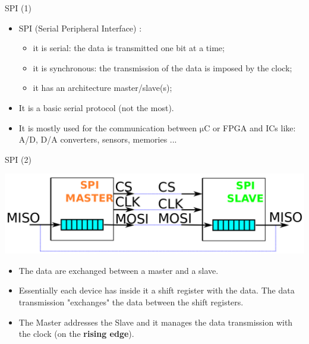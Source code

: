 \documentclass[ignorenonframetext,aspectratio=43,]{beamer}
\begin{document}
\begin{frame}{SPI (1)}
\protect\hypertarget{spi-1}{}

\begin{itemize}
\item
  SPI (Serial Peripheral Interface) :

  \begin{itemize}
  \item
    it is serial: the data is transmitted one bit at a time;
  \item
    it is synchronous: the transmission of the data is imposed by the
    clock;
  \item
    it has an architecture master/slave(s);
  \end{itemize}
\item
  It is a basic serial protocol (not the most).
\item
  It is mostly used for the communication between \(\mathrm{\mu}\)C or
  FPGA and ICs like: A/D, D/A converters, sensors, memories ...
\end{itemize}

\end{frame}

\begin{frame}{SPI (2)}
\protect\hypertarget{spi-2}{}

\includegraphics[width=1\textwidth,height=\textheight]{images/spi_schema}

\begin{itemize}
\item
  The data are exchanged between a master and a slave.
\item
  Essentially each device has inside it a shift register with the data.
  The data transmission "exchanges" the data between the shift
  registers.
\item
  The Master addresses the Slave and it manages the data transmission
  with the clock (on the \textbf{rising edge}).
\end{itemize}

\end{frame}
\end{document}
